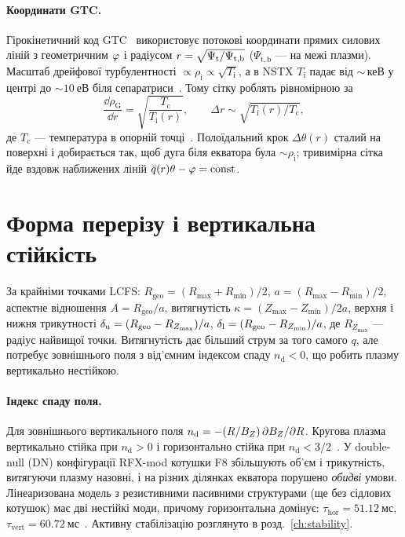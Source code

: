 \paragraph{Координати GTC.} Гірокінетичний код GTC~\cite[с.~6--7]{Wang2006} використовує потокові координати прямих силових ліній з геометричним $\varphi$ і радіусом $r=\sqrt{\Psi_{\mathrm{t}}/\Psi_{\mathrm{t,b}}}$ ($\Psi_{\mathrm{t,b}}$ --- на межі плазми). Масштаб дрейфової турбулентності $\propto\rho_{\mathrm i}\propto\sqrt{T_{\mathrm i}}$, а в NSTX $T_{\mathrm i}$ падає від $\sim$\,кеВ у центрі до $\sim\SI{10}{еВ}$ біля сепаратриси~\cite[с.~6]{Wang2006}. Тому сітку роблять рівномірною за
\begin{equation}\label{eq:04-gtc}
\frac{\dd\rho_{\mathrm{G}}}{\dd r}=\sqrt{\frac{T_{\mathrm c}}{T_{\mathrm i}(r)}},\qquad \Delta r\sim\sqrt{T_{\mathrm i}(r)/T_{\mathrm c}},
\end{equation}
де $T_{\mathrm c}$ --- температура в опорній точці~\cite[с.~7, (1)]{Wang2006}. Полоїдальний крок $\Delta\theta(r)$ сталий на поверхні і добирається так, щоб дуга біля екватора була $\sim\rho_{\mathrm i}$; тривимірна сітка йде вздовж наближених ліній $\bar q(r)\theta-\varphi=\text{const}$.

\section{Форма перерізу і вертикальна стійкість}\label{sec:04-shape}

\begin{outofcorpus}
За крайніми точками LCFS: $R_{\mathrm{geo}}=(R_{\max}+R_{\min})/2$, $a=(R_{\max}-R_{\min})/2$, аспектне відношення $A=R_{\mathrm{geo}}/a$, витягнутість $\kappa=(Z_{\max}-Z_{\min})/2a$, верхня і нижня трикутності $\delta_{\mathrm{u}}=(R_{\mathrm{geo}}-R_{Z_{\max}})/a$, $\delta_{\mathrm{l}}=(R_{\mathrm{geo}}-R_{Z_{\min}})/a$, де $R_{Z_{\max}}$ --- радіус найвищої точки. Витягнутість дає більший струм за того самого $q$, але потребує зовнішнього поля з від'ємним індексом спаду $n_{\mathrm d}<0$, що робить плазму вертикально нестійкою.
\end{outofcorpus}

\paragraph{Індекс спаду поля.} Для зовнішнього вертикального поля $n_{\mathrm d}=-(R/B_{Z})\,\partial B_{Z}/\partial R$. Кругова плазма вертикально стійка при $n_{\mathrm d}>0$ і горизонтально стійка при $n_{\mathrm d}<3/2$~\cite[с.~76]{Merlo2011}. У double-null (DN) конфігурації RFX-mod котушки F8 збільшують об'єм і трикутність, витягуючи плазму назовні, і на різних ділянках екватора порушено \emph{обидві} умови. Лінеаризована модель з резистивними пасивними структурами (ще без сідлових котушок) має дві нестійкі моди, причому горизонтальна домінує: $\tau_{\mathrm{hor}}=\SI{51.12}{мс}$, $\tau_{\mathrm{vert}}=\SI{60.72}{мс}$~\cite[с.~75--76]{Merlo2011}. Активну стабілізацію розглянуто в розд.~\ref{ch:stability}.

